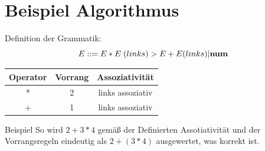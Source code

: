\documentclass[t]{beamer}
\renewcommand{\Coloneqq}{\mathrel{\mathop{::}}=}
\begin{document}
    \section{Beispiel Algorithmus}\label{sec:beispiel-algorithmus}
    \begin{frame}
        \centering
        \begin{block}{Definition der Grammatik:}
            \centering
            \[E \Coloneqq E * E \phantom{|} (links) > E + E (links) | \bold{num} \]
            \bigskip
            \begin{tabular}{|c|c|c|}
                \hline
                Operator & Vorrang & Assoziativität   \\
                \hline
                *        & 2       & links assoziativ \\
                \hline
                +        & 1       & links assoziativ \\
                \hline
            \end{tabular}\label{tab:table4}
        \end{block}
        \bigskip\bigskip
        \begin{exampleblock}{Beispiel}
            So wird $2 + 3 * 4$ gemäß der Definierten Assotiativität und der Vorrangsregeln eindeutig als
            $2 + (3 * 4)$ ausgewertet, was korrekt ist.
        \end{exampleblock}
    \end{frame}
\end{document}
